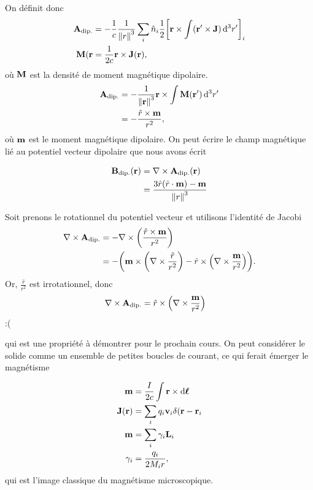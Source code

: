 On définit donc
\begin{align}
    \vb{A}_{\rm dip.}&=-\frac1c\frac1{\norm{r}^3}\sum_i\hat{n}_i\frac12\qty[
    \vb{r}\times\int(\vb{r'}\times\vb{J})\dd[3]{r'}]_i\\
    \vb{M}(\vb{r}&=\frac1{2c}\vb{r}\times\vb{J}(\vb{r}),
\end{align}
où $\vb{M}$ est la densité de moment magnétique dipolaire.
\begin{align}
    \vb{A}_{\rm dip.}&=-\frac1{\norm{\vb{r}}^3}\vb{r}\times
    \int\vb{M}(\vb{r'})\dd[3]{r'}\\
                     &=-\frac{\hat{r}\times\vb{m}}{r^2},
\end{align}
où $\vb{m}$ est le moment magnétique dipolaire. On peut écrire le champ magnétique
lié au potentiel vecteur dipolaire que nous avons écrit

\begin{align}
    \vb{B}_{\rm dip.}(\vb{r})&=\nabla\times\vb{A}_{\rm dip.}(\vb{r})\\
                             &=\frac{3\hat{r}(\hat{r}\cdot\vb{m})-\vb{m}}{\norm{r}^3}
\end{align}

Soit prenons le rotationnel du potentiel vecteur et utilisons l'identité de Jacobi
\begin{align}
    \nabla\times\vb{A}_{\rm dip.}
    &=-\nabla\times\qty(\frac{\hat{r}\times\vb{m}}{r^2})\\
    &=-\qty(\vb{m}\times\qty(\nabla\times\frac{\hat{r}}{r^2})
    -\hat{r}\times\qty(\nabla\times\frac{\vb{m}}{r^2})).
\end{align}
Or, $\frac{\hat{r}}{r^2}$ est irrotationnel, donc
\begin{align}
    \nabla\times\vb{A}_{\rm dip.}
    &=\hat{r}\times\qty(\nabla\times\frac{\vb{m}}{r^2})
\end{align}
:(


qui est une propriété à démontrer pour le prochain cours. On peut considérer le
solide comme un ensemble de petites boucles de courant, ce qui ferait émerger
le magnétisme

\begin{align}
    \vb{m}&=\frac{I}{2c}\int\vb{r}\times\dd{\boldsymbol{\ell}}\\
    \vb{J}(\vb{r})&=\sum_iq_i\vb{v}_i\delta(\vb{r}-\vb{r}_i\\
    \vb{m}&=\sum_i\gamma_i\vb{L}_i\\
    \gamma_i&=\frac{q_i}{2M_ir},
\end{align}
qui est l'image classique du magnétisme microscopique.

